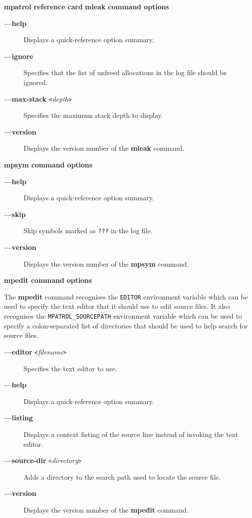 \documentclass[a4paper,landscape,final]{article}
\newcommand{\heading}[1]{\textbf{\normalsize #1}}
\newcommand{\command}[1]{\textbf{#1}}
\newcommand{\flag}[1]{\textbf{---#1}}
\newcommand{\flagpar}[2]{\flag{#1} \texttt{<}\textit{#2}\texttt{>}}
\begin{document}
\begin{multicols}{3}{\textbf{\Large mpatrol reference card}}
\vskip 12pt
\heading{mleak command options}
\vskip 6pt

\begin{description}
\item[\flag{help}]
Displays a quick-reference option summary.
\item[\flag{ignore}]
Specifies that the list of unfreed allocations in the log file should be
ignored.
\item[\flagpar{max-stack}{depth}]
Specifies the maximum stack depth to display.
\item[\flag{version}]
Displays the version number of the \command{mleak} command.
\end{description}

\vskip 12pt
\heading{mpsym command options}
\vskip 6pt

\begin{description}
\item[\flag{help}]
Displays a quick-reference option summary.
\item[\flag{skip}]
Skip symbols marked as \texttt{???} in the log file.
\item[\flag{version}]
Displays the version number of the \command{mpsym} command.
\end{description}

\vskip 12pt
\heading{mpedit command options}
\vskip 6pt

The \command{mpedit} command recognises the \texttt{EDITOR} environment variable
which can be used to specify the text editor that it should use to edit source
files.  It also recognises the \texttt{MPATROL\_SOURCEPATH} environment variable
which can be used to specify a colon-separated list of directories that should
be used to help search for source files.

\begin{description}
\item[\flagpar{editor}{filename}]
Specifies the text editor to use.
\item[\flag{help}]
Displays a quick-reference option summary.
\item[\flag{listing}]
Displays a context listing of the source line instead of invoking the text
editor.
\item[\flagpar{source-dir}{directory}]
Adds a directory to the search path used to locate the source file.
\item[\flag{version}]
Displays the version number of the \command{mpedit} command.
\end{description}


\end{multicols}
\end{document}
